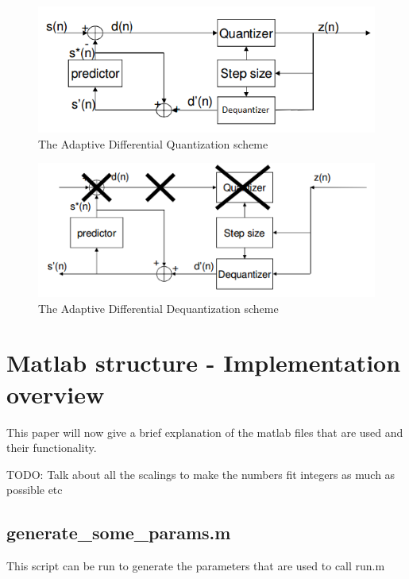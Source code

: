 \documentclass[a4paper]{article}
\begin{document}
\begin{figure}[hbt]
\includegraphics[width = \textwidth]{Quantization.png}
\caption{The Adaptive Differential Quantization scheme}
\label{fig:quantization}
\end{figure}
\begin{figure}[hbt]
\includegraphics[width = \textwidth]{Dequantization.png}
\caption{The Adaptive Differential Dequantization scheme}
\label{fig:dequantization}
\end{figure}

\section{Matlab structure - Implementation overview}
This paper will now give a brief explanation of the matlab files that are used and their functionality.

TODO: Talk about all the scalings to make the numbers fit integers as much as possible etc

\subsection{generate\_some\_params.m}
This script can be run to generate the parameters that are used to call run.m
\end{document}
